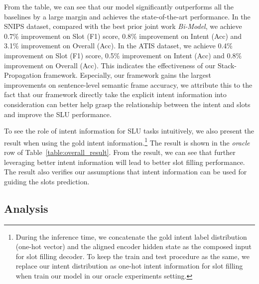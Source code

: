 \documentclass[11pt,a4paper]{article}
\begin{document}
From the table, we can see that our model
significantly outperforms all the baselines by a 
large margin and achieves the state-of-the-art 
performance.  In the SNIPS dataset, compared 
with the best prior joint work \textit{Bi-Model},
we achieve 0.7\% improvement on Slot (F1) score, 
0.8\% improvement on Intent (Acc) and 3.1\% 
improvement on Overall (Acc). In the ATIS dataset, we 
achieve 0.4\% improvement on Slot (F1) score, 
0.5\% improvement on Intent (Acc) and 0.8\%  
improvement on Overall (Acc).
This indicates the effectiveness of our 
Stack-Propagation framework. Especially, our framework gains the 
largest improvements on sentence-level semantic frame accuracy, we attribute this to the fact 
that our framework directly take the explicit intent information into 
consideration can better help grasp the relationship between the intent and slots and improve the SLU performance.

To see the role of intent information for SLU tasks intuitively, we also present the result when using the gold intent 
information.\footnote{During the inference time, we concatenate the gold intent 
	label distribution (one-hot vector) and the aligned encoder hidden state   as the 
	composed input for slot filling decoder. To keep the train and test procedure as the same, we replace our intent distribution as one-hot intent information for slot filling when train our model in our oracle experiments setting.} The result is 
shown in the \textit{oracle} row of Table~\ref{table:overall_result}. 
From the result, we can see that further leveraging better intent
information will lead to better slot filling performance. The result also verifies our assumptions that intent information can be used for guiding the slots prediction.


\subsection{Analysis}
\end{document}
